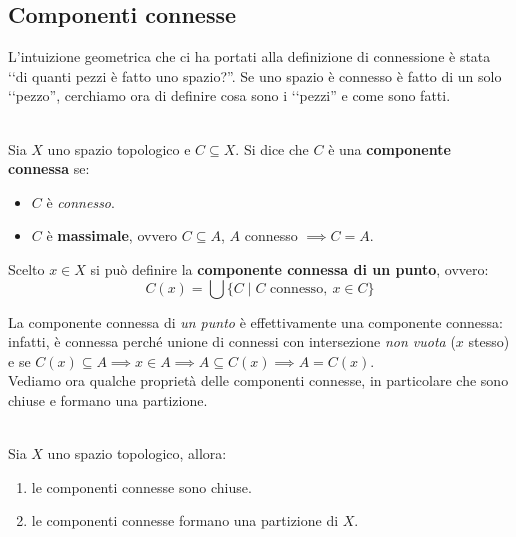 \subsection{Componenti connesse}
L'intuizione geometrica che ci ha portati alla definizione di connessione è stata ‘‘di quanti pezzi è fatto uno spazio?''. Se uno spazio è connesso è fatto di un solo ‘‘pezzo'', cerchiamo ora di definire cosa sono i ‘‘pezzi'' e come sono fatti.
\begin{define}~{}\\
	Sia $X$ uno spazio topologico e $C\subseteq X$. Si dice che $C$ è una \textbf{componente connessa} se:
		\begin{itemize}
			\item $C$ è \textit{connesso}.
			\item $C$ è \textbf{massimale}, ovvero $C\subseteq A$, $A$ connesso $\implies C=A$.
		\end{itemize}
	Scelto $x\in X$ si può definire la \textbf{componente connessa di un punto}, ovvero:
	\begin{equation}
		\displaystyle C(x)=\bigcup \{C \mid C\text{ connesso},\ x\in C\}
	\end{equation}
\vspace{-6mm}
\end{define}
La componente connessa di \textit{un punto} è effettivamente una componente connessa: infatti, è connessa perché unione di connessi con intersezione \textit{non vuota} ($x$ stesso) e se $C(x)\subseteq A \implies x\in A \implies A\subseteq C(x) \implies A=C(x)$.\\
Vediamo ora qualche proprietà delle componenti connesse, in particolare che sono chiuse e formano una partizione.
\begin{theorema}~{}\\
	Sia $X$ uno spazio topologico, allora:
		\begin{enumerate}
			\item le componenti connesse sono chiuse.
			\item le componenti connesse formano una partizione di $X$.
		\end{enumerate}
	\vspace{-3mm}
\end{theorema}
